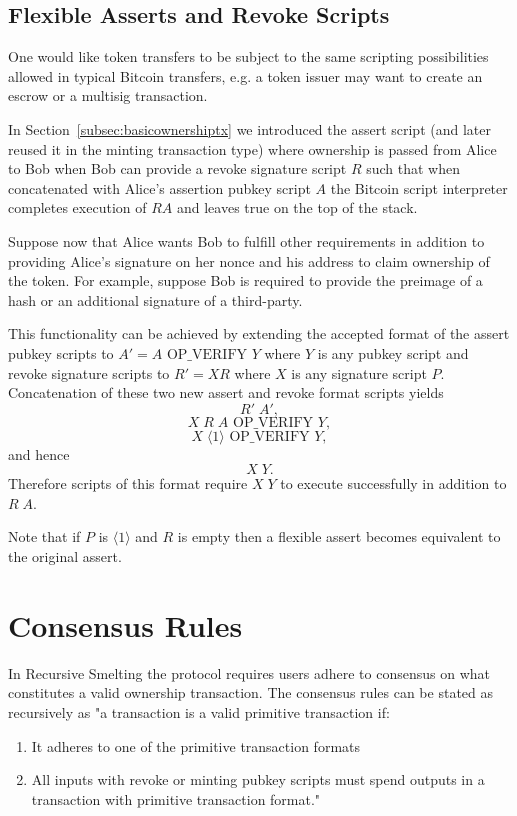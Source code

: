 \documentclass[9pt,oneside]{amsart}
\begin{document}
\begin{multicols}{2}
\subsection{Flexible Asserts and Revoke Scripts}\label{subsec:flexassertrevoke}
One would like token transfers to be subject to the same scripting possibilities allowed in typical Bitcoin transfers, e.g. a token issuer may want to create an escrow or a multisig transaction.

In Section~\ref{subsec:basicownershiptx} we introduced the assert script (and later reused it in the minting transaction type) where ownership is passed from Alice to Bob when Bob can provide a revoke signature script $R$ such that when concatenated with Alice's assertion pubkey script $A$ the Bitcoin script interpreter completes execution of $RA$ and leaves true on the top of the stack. 

Suppose now that Alice wants Bob to fulfill other requirements in addition to providing Alice's signature on her nonce and his address to claim ownership of the token. For example, suppose Bob is required to provide the preimage of a hash or an additional signature of a third-party. 

This functionality can be achieved by extending the accepted format of the assert pubkey scripts to $A' = A \text{ OP\_VERIFY } Y$ where $Y$ is any pubkey script and revoke signature scripts to $R' = X R$ where $X$ is any signature script $P$. Concatenation of these two new assert and revoke format scripts yields
\[R' \; A',\]
\[X \; R \; A \text{ OP\_VERIFY } Y,\]
\[X \; \langle 1 \rangle \text{ OP\_VERIFY } Y,\]
and hence
\[X \; Y.\]
Therefore scripts of this format require $X \; Y$ to execute successfully in addition to $R \; A$. 

Note that if $P$ is $\langle 1 \rangle$ and $R$ is empty then a flexible assert becomes equivalent to the original assert.


\section{Consensus Rules}
In Recursive Smelting the protocol requires users adhere to consensus on what constitutes a valid ownership transaction. The consensus rules can be stated as recursively as "a  transaction is a valid primitive transaction if:
    \begin{enumerate}
        \item It adheres to one of the primitive transaction formats 
        \item All inputs with revoke or minting pubkey scripts must  spend outputs in a transaction with primitive transaction format."
    \end{enumerate}
    

\end{multicols}
\end{document}
